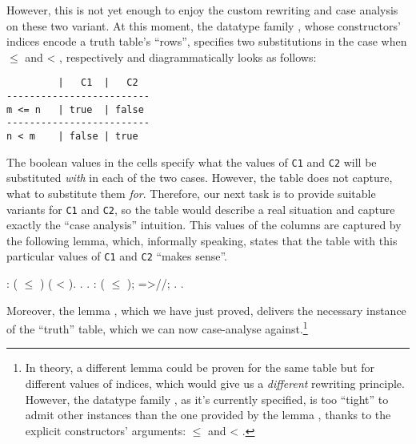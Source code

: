 However, this is not yet enough to enjoy the custom rewriting and case
analysis on these two variant. At this moment, the datatype family
, whose constructors' indices encode a truth table's
``rows'', specifies two substitutions in the case when  \ensuremath{\le}  and  <
, respectively and diagrammatically looks as follows:


\begin{verbatim}
         |   C1  |   C2
-------------------------
m <= n   | true  | false
-------------------------
n < m    | false | true
\end{verbatim}


The boolean values in the cells specify what the values of
\texttt{C1} and \texttt{C2} will be substituted \textit{with} in each of
the two cases. However, the table does not capture, what to substitute
them \textit{for}.  Therefore, our next task is to provide suitable variants
for \texttt{C1} and \texttt{C2}, so the table would describe a
real situation and capture exactly the ``case analysis'' intuition. This
values of the columns are captured by the following lemma, which,
informally speaking, states that the table with this particular values
of \texttt{C1} and \texttt{C2} ``makes sense''.


\coqdoceol
\coqdocemptyline
\coqdocnoindent
{}    :    ( \ensuremath{\le} ) ( < ).\coqdoceol
\coqdocnoindent
{}.\coqdoceol
\coqdocnoindent
{} .\coqdoceol
\coqdocnoindent
{}  : ( \ensuremath{\le} ); =>//;   .\coqdoceol
\coqdocnoindent
{}.

\coqdocemptyline


Moreover, the lemma , which we have just proved, delivers the
necessary instance of the ``truth'' table, which we can now case-analyse
against.\footnote{In theory, a different lemma could be proven for
the same table but for different values of indices, which would give
us a \textit{different} rewriting principle. However, the datatype family
, as it's currently specified, is too ``tight'' to admit
other instances than the one provided by the lemma , thanks to
the explicit constructors' arguments:  \ensuremath{\le}  and  < .}


